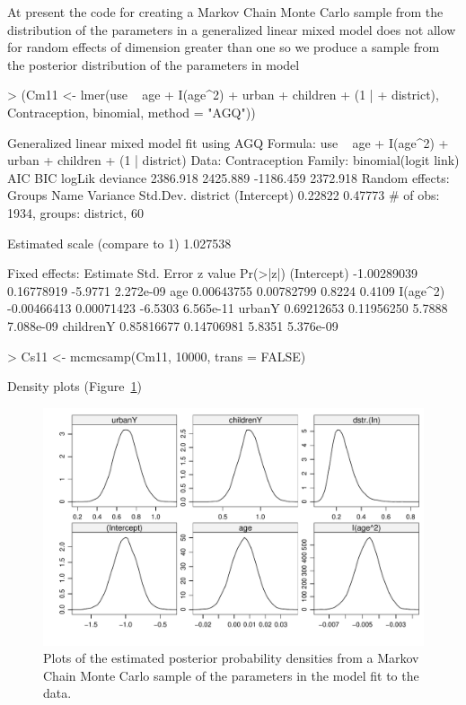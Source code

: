 \documentclass[12pt]{article}
\begin{document}
At present the code for creating a Markov Chain Monte Carlo sample
from the distribution of the parameters in a generalized linear mixed
model does not allow for random effects of dimension greater than one
so we produce a sample from the posterior distribution of the
parameters in model 
\begin{Schunk}
\begin{Sinput}
> (Cm11 <- lmer(use ~ age + I(age^2) + urban + children + (1 | 
+     district), Contraception, binomial, method = "AGQ"))
\end{Sinput}
\begin{Soutput}
Generalized linear mixed model fit using AGQ 
Formula: use ~ age + I(age^2) + urban + children + (1 | district) 
   Data: Contraception 
 Family: binomial(logit link)
      AIC      BIC    logLik deviance
 2386.918 2425.889 -1186.459 2372.918
Random effects:
     Groups        Name    Variance    Std.Dev. 
   district (Intercept)     0.22822     0.47773 
# of obs: 1934, groups: district, 60

Estimated scale (compare to 1)  1.027538 

Fixed effects:
               Estimate  Std. Error z value  Pr(>|z|)
(Intercept) -1.00289039  0.16778919 -5.9771 2.272e-09
age          0.00643755  0.00782799  0.8224    0.4109
I(age^2)    -0.00466413  0.00071423 -6.5303 6.565e-11
urbanY       0.69212653  0.11956250  5.7888 7.088e-09
childrenY    0.85816677  0.14706981  5.8351 5.376e-09
\end{Soutput}
\begin{Sinput}
> Cs11 <- mcmcsamp(Cm11, 10000, trans = FALSE)
\end{Sinput}
\end{Schunk}
Density plots (Figure~\ref{fig:Contra2})
\begin{figure}[tbp]
  \centering
  \includegraphics[width=\textwidth]{figs/SoftRev-Contra2}
  \caption{Plots of the estimated posterior probability densities from
    a Markov Chain Monte Carlo sample of the parameters in the model
     fit to the  data.} 
  \label{fig:Contra2}
\end{figure}
\end{document}
